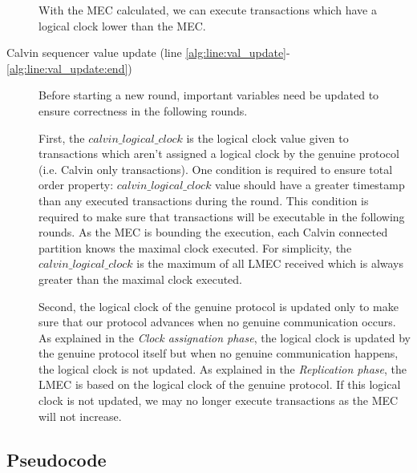 \documentclass[a4paper, 10pt]{article}
\newcommand{\PE}{Calvin}
\begin{document}
\begin{description}
        With the MEC calculated, we can execute transactions which have a logical clock lower than the MEC.

    \item[Calvin sequencer value update (line \ref{alg:line:val_update}-\ref{alg:line:val_update:end})]
        Before starting a new round, important variables need be updated
        to ensure correctness in the following rounds.

        First, the $calvin\_logical\_clock$ is the logical clock value given to transactions which aren't assigned a
        logical clock by the genuine protocol (i.e. Calvin only transactions). One condition is
        required to ensure total order property: $calvin\_logical\_clock$ value should have a
        greater timestamp than any executed transactions during the round. This condition is
        required to make sure that transactions will be executable in the following rounds.
        As the MEC is bounding the execution, each \PE{} connected partition knows the
        maximal clock executed. For simplicity, the $calvin\_logical\_clock$ is the maximum of
        all LMEC received which is always greater than the maximal clock executed.

        Second, the logical clock of the genuine protocol is updated only to make sure that our protocol advances when
        no genuine communication occurs. As explained in the \textit{Clock assignation phase}, the logical clock
        is updated by the genuine protocol itself but when no genuine communication happens, the logical clock is not updated.
        As explained in the \textit{Replication phase}, the LMEC is based on the logical clock of the genuine protocol.
        If this logical clock is not updated, we may no longer execute transactions as the MEC will not increase.

\end{description}

\subsection{Pseudocode}
\end{document}
